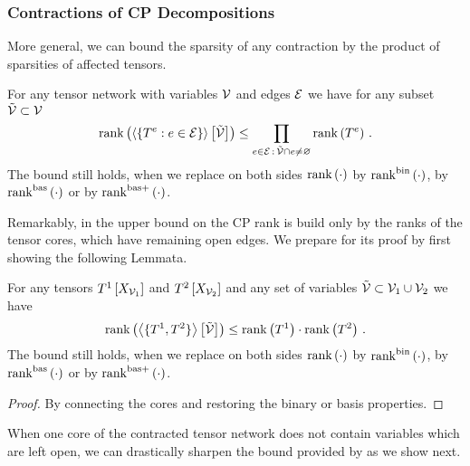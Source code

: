 \subsubsection{Contractions of CP Decompositions}

More general, we can bound the sparsity of any contraction by the product of sparsities of affected tensors.

\begin{theorem}\label{the:CPrankContractionBound}
	For any tensor network with variables $\mathcal{V}$ and edges $\mathcal{E}$ we have for any subset $\tilde{\mathcal{V}}\subset\mathcal{V}$
		\[ \mathrm{rank}\left(\left\langle \{T^{e} : e\in\mathcal{E} \}\right\rangle \left[ \tilde{\mathcal{V}} \right]\right) \leq 
		\prod_{e\in\mathcal{E} \, : \, \tilde{\mathcal{V}}\cap e \neq \varnothing} \mathrm{rank}\left(T^{e}\right) \, . \]
	The bound still holds, when we replace on both sides $\mathrm{rank}\left(\cdot\right)$ by $\mathrm{rank}^{\mathrm{bin}}\left(\cdot\right)$, by $\mathrm{rank}^{\mathrm{bas}}\left(\cdot\right)$ or by $\mathrm{rank}^{\mathrm{bas+}}\left(\cdot\right)$.
\end{theorem}


Remarkably, in  the upper bound on the CP rank is build only by the ranks of the tensor cores, which have remaining open edges.
We prepare for its proof by first showing the following Lemmata.

\begin{lemma}\label{lem:sparsityGeneralContraction}
	For any tensors $T^{1}\left[X_{\mathcal{V}_1}\right]$ and $T^{2}\left[X_{\mathcal{V}_2}\right]$ and any set of variables $\tilde{\mathcal{V}}\subset\mathcal{V}_1\cup\mathcal{V}_2$ we have
		\[ \mathrm{rank}\left(\left\langle \{T^{1},T^{2}\}\right\rangle \left[ \tilde{\mathcal{V}} \right]\right) \leq \mathrm{rank}\left(T^{1}\right) \cdot \mathrm{rank}\left(T^{2}\right) \, . \]
	The bound still holds, when we replace on both sides $\mathrm{rank}\left(\cdot\right)$ by $\mathrm{rank}^{\mathrm{bin}}\left(\cdot\right)$, by $\mathrm{rank}^{\mathrm{bas}}\left(\cdot\right)$ or by $\mathrm{rank}^{\mathrm{bas+}}\left(\cdot\right)$.
\end{lemma}
\begin{proof}
	By connecting the cores and restoring the binary or basis properties.
\end{proof}

When one core of the contracted tensor network does not contain variables which are left open, we can drastically sharpen the bound provided by  as we show next.

